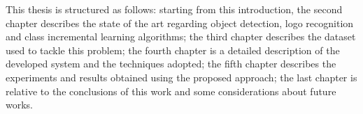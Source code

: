 \vspace{1.5\baselineskip}
This thesis is structured as follows: starting from this introduction, the second chapter describes the state of the art regarding object detection, logo recognition and class incremental learning algorithms; the third chapter describes the dataset used to tackle this problem; the fourth chapter is a detailed description of the developed system and the techniques adopted; the fifth chapter describes the experiments and results obtained using the proposed approach; the last chapter is relative to the conclusions of this work and some considerations about future works.